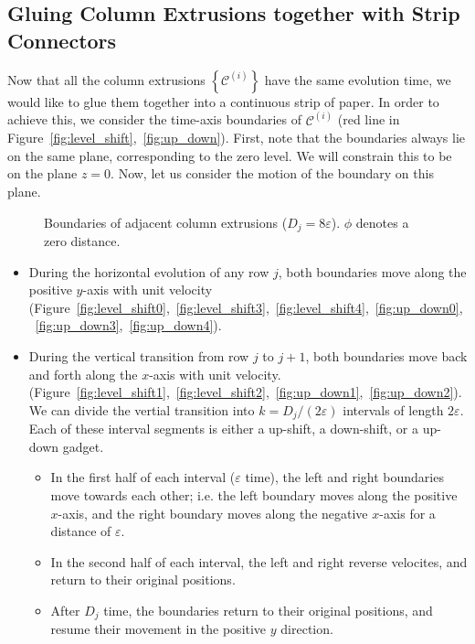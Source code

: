 \subsection{Gluing Column Extrusions together with Strip Connectors}
\label{sec:strip_connectors}
Now that all the column extrusions $\left\{ \mathcal C^{(i)} \right\}$ have the same evolution time,
we would like to glue them together into a continuous strip of paper.
In order to achieve this, we consider the time-axis boundaries of $\mathcal C^{(i)}$ (red line in Figure~\ref{fig:level_shift},~\ref{fig:up_down}).
First, note that the boundaries always lie on the same plane, corresponding to the zero level.
We will constrain this to be on the plane $z=0$. Now, let us consider the motion of the boundary on this plane.

\graphicspath{{./figures/}}
\begin{wrapfigure}[16]{r}{0.27\textwidth}
    \vspace{-2.8em}
    \def\svgwidth{0.27\textwidth}
    \caption{Boundaries of adjacent column extrusions ($D_j = 8\varepsilon$). $\phi$ denotes a zero distance.}
    \label{fig:boundaries}
\end{wrapfigure}
\begin{itemize}
    \item During the horizontal evolution of any row $j$, both boundaries move along the positive $y$-axis with unit velocity
          (Figure~\ref{fig:level_shift0},~\ref{fig:level_shift3},~\ref{fig:level_shift4},~\ref{fig:up_down0},~\ref{fig:up_down3},~\ref{fig:up_down4}).
    \item During the vertical transition from row $j$ to $j+1$, both boundaries move back and forth along the $x$-axis with unit velocity.
          (Figure~\ref{fig:level_shift1},~\ref{fig:level_shift2},~\ref{fig:up_down1},~\ref{fig:up_down2}).
          We can divide the vertial transition into $k = D_j/(2\varepsilon)$ intervals of length $2\varepsilon$.
          Each of these interval segments is either a up-shift, a down-shift, or a up-down gadget.
    \begin{itemize}
        \item In the first half of each interval ($\varepsilon$ time), the left and right boundaries move towards each other;
              i.e. the left boundary moves along the positive $x$-axis,
              and the right boundary moves along the negative $x$-axis for a distance of $\varepsilon$.
        \item In the second half of each interval, the left and right reverse velocites, and return to their original positions.
        \item After $D_j$ time, the boundaries return to their original positions, and resume their movement in the positive $y$ direction.
    \end{itemize}
\end{itemize}

